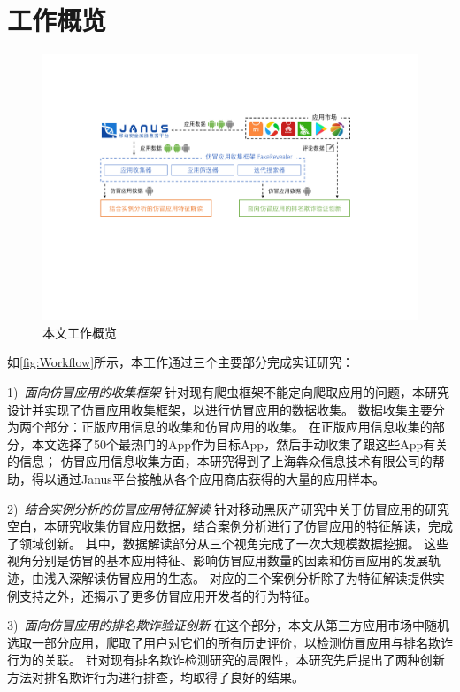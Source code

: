 \section{工作概览}

\begin{figure}[htbp]
	\centering
	\includegraphics[width=\textwidth]{./Figures/edwin-overview}
	\caption{本文工作概览}
	\label{fig:Workflow}
	\vspace{-3mm}
\end{figure}

如\autoref{fig:Workflow}所示，本工作通过三个主要部分完成实证研究：

1)\ \emph{面向仿冒应用的收集框架\mytool } \quad
针对现有爬虫框架不能定向爬取应用的问题，本研究设计并实现了仿冒应用收集框架\mytool，以进行仿冒应用的数据收集。
数据收集主要分为两个部分：正版应用信息的收集和仿冒应用的收集。
在正版应用信息收集的部分，本文选择了50个最热门的App作为目标App，然后手动收集了跟这些App有关的信息；
仿冒应用信息收集方面，本研究得到了上海犇众信息技术有限公司的帮助，得以通过Janus平台接触从各个应用商店获得的大量的应用样本。

2)\ \emph{结合实例分析的仿冒应用特征解读} \quad
针对移动黑灰产研究中关于仿冒应用的研究空白，本研究收集仿冒应用数据，结合案例分析进行了仿冒应用的特征解读，完成了领域创新。
其中，数据解读部分从三个视角完成了一次大规模数据挖掘。
这些视角分别是仿冒的基本应用特征、影响仿冒应用数量的因素和仿冒应用的发展轨迹，由浅入深解读仿冒应用的生态。
对应的三个案例分析除了为特征解读提供实例支持之外，还揭示了更多仿冒应用开发者的行为特征。

3)\ \emph{面向仿冒应用的排名欺诈验证创新} \quad
在这个部分，本文从第三方应用市场中随机选取一部分应用，爬取了用户对它们的所有历史评价，以检测仿冒应用与排名欺诈行为的关联。
针对现有排名欺诈检测研究的局限性，本研究先后提出了两种创新方法对排名欺诈行为进行排查，均取得了良好的结果。


